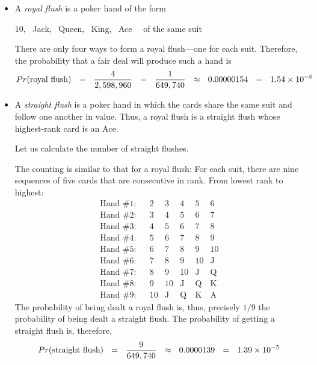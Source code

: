  
\begin{itemize}
\item
A {\it royal flush} is a poker hand of the form

\smallskip

\hspace*{.25in}$10$, \ {\sc Jack}, \ {\sc Queen}, \ {\sc King}, \ {\sc Ace} \ \ of the same suit

\smallskip

\noindent
There are only four ways to form a royal flush---one for each suit.  Therefore, the probability that
a fair deal will produce such a hand is
\[ 
Pr(\mbox{royal flush}) \ \ = \ \ \frac{4}{2,598,960} \ \ = \ \ {1 \over {649,740}}
   \ \ \approx \ \ 0.00000154 \ \ = \ \ 1.54 \times 10^{-6} 
\]

\medskip\item
A {\it straight flush} is a poker hand in which the cards share the same suit and follow one 
another in value.  Thus, a royal flush is a straight flush whose highest-rank card is an {\sc Ace}.

\medskip

Let us calculate the number of straight flushes.

\smallskip

The counting is similar to that for a royal flush:  For each suit, there are nine sequences of five cards that are consecutive in rank.  From lowest rank to highest:
\[ \begin{array}{llccccc}
\mbox{Hand \#1}: & &
2 & 3 & 4 & 5 & 6 \\
\mbox{Hand \#2}: & &
3 & 4 & 5 & 6 & 7 \\
\mbox{Hand \#3}: & &
4 & 5 & 6 & 7 & 8 \\
\mbox{Hand \#4}: & &
5 & 6 & 7 & 8 & 9 \\
\mbox{Hand \#5}: & &
6 & 7 & 8 & 9 & 10 \\
\mbox{Hand \#6}: & &
7 & 8 & 9 & 10 &  \mbox{J} \\
\mbox{Hand \#7}: & &
8 & 9 & 10 &  \mbox{J} &   \mbox{Q} \\
\mbox{Hand \#8}: & &
9 & 10 &  \mbox{J} & \mbox{Q} &  \mbox{K}  \\
\mbox{Hand \#9}: & &
10 &  \mbox{J}
     & \mbox{Q}
     & \mbox{K}
     & \mbox{A}
\end{array} \]
The probability of being dealt a royal flush is, thus, precisely $1/9$ the probability of being dealt a straight flush.  The probability of getting a straight flush is, therefore,
\[  Pr(\mbox{straight flush}) \ \ = \ \
{9 \over {649,740}} \ \ \approx \ \ 0.0000139  \ \ = \ \ 1.39 \times 10^{-5} \]


\end{itemize}
